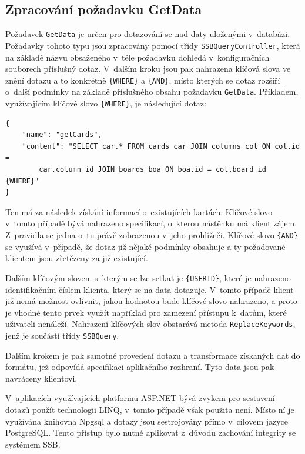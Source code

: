 \subsection{Zpracování požadavku GetData}\label{sec:getdata}
Požadavek \texttt{GetData} je určen pro dotazování se nad daty uloženými v~databázi. Požadavky tohoto typu jsou zpracovány pomocí třídy \texttt{SSBQueryController}, která na základě názvu obsaženého v~těle požadavku dohledá v~konfiguračních souborech příslušný dotaz. V~dalším kroku jsou pak nahrazena klíčová slova ve znění dotazu a to konkrétně \texttt{\{WHERE\}} a \texttt{\{AND\}}, místo kterých se dotaz rozšíří o~další podmínky na základě příslušného obsahu požadavku \texttt{GetData}. Příkladem, využívajícím klíčové slovo \texttt{\{WHERE\}}, je následující dotaz:

\begin{verbatim}
{
    "name": "getCards",
    "content": "SELECT car.* FROM cards car JOIN columns col ON col.id = 
        car.column_id JOIN boards boa ON boa.id = col.board_id {WHERE}"
}
\end{verbatim}

Ten má za následek získání informací o~existujících kartách. Klíčové slovo v~tomto případě bývá nahrazeno specifikací, o~kterou nástěnku má klient zájem. Z~pravidla se jedna o~tu právě zobrazenou v~jeho prohlížeči. Klíčové slovo \texttt{\{AND\}} se využívá v~případě, že dotaz již nějaké podmínky obsahuje a ty požadované klientem jsou zřetězeny za již existující.

Dalším klíčovým slovem s~kterým se lze setkat je \texttt{\{USERID\}}, které je nahrazeno identifikačním číslem klienta, který se na data dotazuje. V~tomto případě klient již nemá možnost ovlivnit, jakou hodnotou bude klíčové slovo nahrazeno, a proto je vhodné tento prvek využít například pro zamezení přístupu k~datům, které uživateli nenáleží.
Nahrazení klíčových slov obstarává metoda \texttt{ReplaceKeywords}, jenž je součástí třídy \texttt{SSBQuery}.

Dalším krokem je pak samotné provedení dotazu a transformace získaných dat do formátu, jež odpovídá specifikaci aplikačního rozhraní. Tyto data jsou pak navráceny klientovi.

V~aplikacích využívajících platformu ASP.NET bývá zvykem pro sestavení dotazů použít technologii LINQ, v~tomto případě však použita není. Místo ní je využívána knihovna Npgsql a dotazy jsou sestrojovány přímo v~cílovem jazyce PostgreSQL. Tento přístup bylo nutné aplikovat z~důvodu zachování integrity se systémem SSB.

